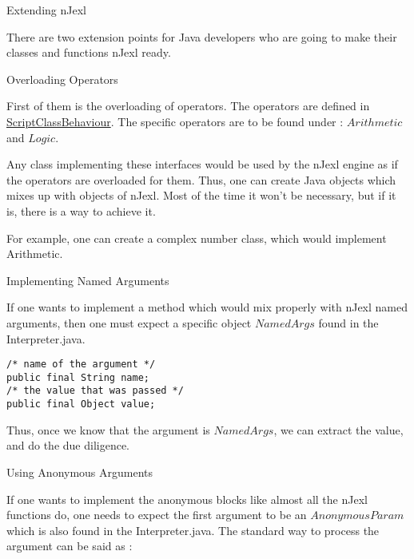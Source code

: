 \begin{section}{Extending nJexl}

There are two extension points for Java developers
who are going to make their classes and functions nJexl ready.
 
\begin{subsection}{Overloading Operators}

First of them is the overloading of operators.
The operators are defined in 
\href{https://github.com/nmondal/njexl/blob/master/lang/src/main/java/com/noga/njexl/lang/extension/oop/ScriptClassBehaviour.java}{ScriptClassBehaviour}. The specific operators are to be found under : $Arithmetic$ and $Logic$.

Any class implementing these interfaces would be used by the nJexl engine as if the operators are
overloaded for them. Thus, one can create Java objects which mixes up with objects of nJexl.
Most of the time it won't be necessary, but if it is, there is a way to achieve it.

For example, one can create a complex number class, which would implement Arithmetic.
\end{subsection}

\begin{subsection}{Implementing Named Arguments}

If one wants to implement a method which would mix properly with nJexl named arguments,
then one must expect a specific object $NamedArgs$ found in the Interpreter.java.

\begin{lstlisting}[style=myJavaStyle]
/* name of the argument */
public final String name;
/* the value that was passed */
public final Object value;
\end{lstlisting}

Thus, once we know that the argument is $NamedArgs$, we can extract the value, 
and do the due diligence. 

\end{subsection}


\begin{subsection}{Using Anonymous Arguments}

If one wants to implement the anonymous blocks like almost all the nJexl functions do, 
one needs to expect the first argument to be an $AnonymousParam$ which is also found in the Interpreter.java.
The standard way to process the argument can be said as :


\end{subsection}
\end{section}
